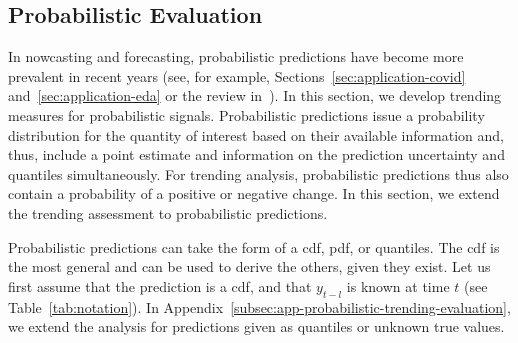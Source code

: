 \documentclass[pdflatex]{sn-jnl}
\theoremstyle{plain}%
\theoremstyle{definition}
\begin{document}
\subsection{Probabilistic Evaluation}\label{subsec:trending-probabilistic}

In nowcasting and forecasting, probabilistic predictions have become more prevalent in recent years (see, for example, Sections~\ref{sec:application-covid} and~\ref{sec:application-eda} or the review in~\cite{Gneiting2014}).
In this section, we develop trending measures for probabilistic signals.
Probabilistic predictions issue a probability distribution for the quantity of interest based on their available information and, thus, include a point estimate and information on the prediction uncertainty and quantiles simultaneously.
For trending analysis, probabilistic predictions thus also contain a probability of a positive or negative change.
In this section, we extend the trending assessment to probabilistic predictions.

Probabilistic predictions can take the form of a \ac{cdf}, \ac{pdf}, or quantiles.
The \ac{cdf} is the most general and can be used to derive the others, given they exist.
Let us first assume that the prediction is a \ac{cdf}, and that $y_{t-l}$ is known at time $t$ (see Table~\ref{tab:notation}).
In Appendix~\ref{subsec:app-probabilistic-trending-evaluation}, we extend the analysis for predictions given as quantiles or unknown true values.
\end{document}
